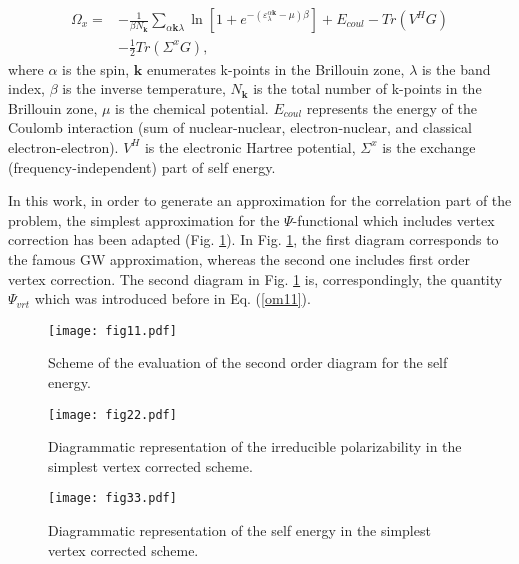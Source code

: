 \documentclass[aps,prb,floatfix,epsfig,twocolumn,preprintnumbers]{revtex4}
\begin{document}
\begin{align}\label{om2}
\Omega_{x}=&-\frac{1}{\beta N_{\mathbf{k}}}\sum_{\alpha \mathbf{k}\lambda} \ln 
[1+e^{-(\varepsilon^{\alpha\mathbf{k}}_{\lambda}-\mu)\beta}]+E_{coul}-Tr (V^{H}G)\nonumber\\
&-\frac{1}{2} Tr (\Sigma^{x}G),
\end{align}
where $\alpha$ is the spin, $\mathbf{k}$ enumerates k-points in the Brillouin zone, $\lambda$ is the band index, $\beta$ is the inverse temperature, $N_{\mathbf{k}}$ is the total number of k-points in the Brillouin zone, $\mu$ is the chemical potential. $E_{coul}$ represents the energy of the Coulomb interaction (sum of nuclear-nuclear, electron-nuclear, and classical electron-electron). $V^{H}$ is the electronic Hartree potential, $\Sigma^{x}$ is the exchange (frequency-independent) part of self energy.









In this work, in order to generate an approximation for the correlation part of the problem, the simplest approximation for the $\Psi$-functional which includes vertex correction has been adapted (Fig. \ref{diag_Psi}). In Fig. \ref{diag_Psi}, the first diagram corresponds to the famous GW approximation, whereas the second one includes first order vertex correction. The second diagram in Fig. \ref{diag_Psi} is, correspondingly, the quantity $\Psi_{vrt}$ which was introduced before in Eq. (\ref{om11}).



\begin{figure}[t]
\centering
\texttt{[image: fig11.pdf]}
\caption{Scheme of the evaluation of the second order diagram for the self energy.}
\label{diag_Psi}
\end{figure}


\begin{figure}[b]
\centering
\texttt{[image: fig22.pdf]}
\caption{Diagrammatic representation of the irreducible polarizability in the simplest vertex corrected scheme.}
\label{diag_P}
\end{figure}




\begin{figure}[t]
\centering
\texttt{[image: fig33.pdf]}
\caption{Diagrammatic representation of the self energy in the simplest vertex corrected scheme.}
\label{diag_S}
\end{figure}
\end{document}
